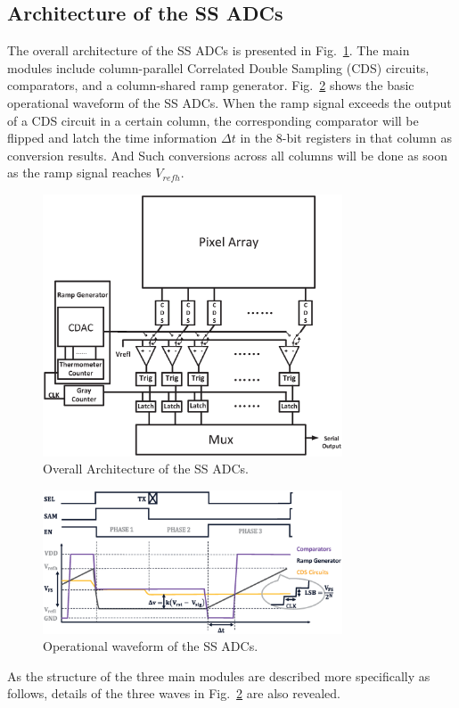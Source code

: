 \documentclass[conference]{IEEEtran}
\begin{document}
\subsection{Architecture of the SS ADCs}

The overall architecture of the SS ADCs is presented in Fig.~\ref{SSADC}. The main modules include column-parallel Correlated Double Sampling (CDS) circuits, comparators, and a column-shared ramp generator. Fig.~\ref{SSWAVE} shows the basic operational waveform of the SS ADCs. When the ramp signal exceeds the output of a CDS circuit in a certain column, the corresponding comparator will be flipped and latch the time information $\Delta t$ in the 8-bit registers in that column as conversion results. And Such conversions across all columns will be done as soon as the ramp signal reaches $V_{refh}$.
\begin{figure}[htbp]
	\centerline{\includegraphics[width=3.5in]{./Figures/SSADC.eps}}
	\caption{Overall Architecture of the SS ADCs.}
	\label{SSADC}
\end{figure} 
\begin{figure}[htbp]
	\centerline{\includegraphics[width=3.5in]{./Figures/SSWAVE.eps}}
	\caption{Operational waveform of the SS ADCs.}
	\label{SSWAVE}
\end{figure}

As the structure of the three main modules are described more specifically as follows, details of the three waves in Fig.~\ref{SSWAVE} are also revealed.
\end{document}
